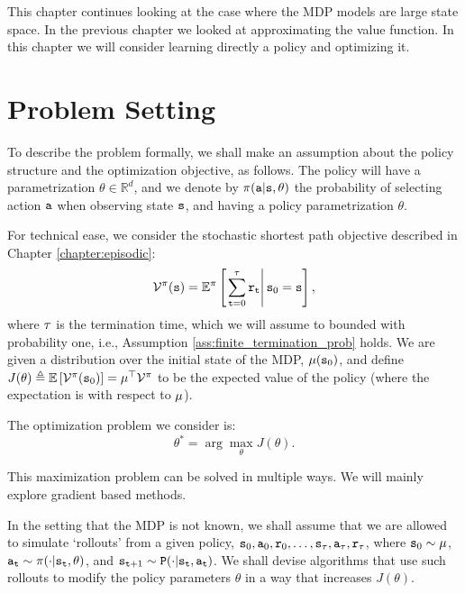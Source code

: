 This chapter continues looking at the case where the MDP models are
large state space. In the previous chapter we looked at
approximating the value function. In this chapter we will consider
learning directly a policy and optimizing it.

\section{Problem Setting}

To describe the problem formally, we shall make an assumption about the policy structure and the optimization objective, as follows. 
The policy will have a
parametrization $\theta\in \mathbb{R}^{d}$, and we denote by 
$\pi({\tt a}|{\tt s},\theta)$ the probability of
selecting action ${\tt a}$ when observing state ${\tt s}$, and having a policy parametrization
$\theta$. 

For technical ease, we consider the stochastic shortest path objective described in Chapter \ref{chapter:episodic}:
\[\mathcal{V}^\pi({\tt s}) = \mathbb E^{\pi }\left[\left.\sum\limits_{{\tt t} = 0}^\tau {{{\tt r}_{\tt t}}} \right|{\tt s}_0 = {\tt s}\right],\]
where $\tau$ is the termination time, which we will assume to bounded with probability one, i.e., Assumption \ref{ass:finite_termination_prob} holds.
We are given a distribution over the initial state of the MDP, $\mu({\tt s}_0)$, and define $J(\theta) \triangleq \mathbb{E}\left[ \mathcal{V}^\pi({\tt s}_0)\right] = \mu^\top \mathcal{V}^\pi$ to be the expected value of the policy (where the expectation is with respect to $\mu$).

The optimization problem we consider is:
\begin{equation}\label{eq:policy_opt}
\theta^* = \arg\max_\theta J(\theta).
\end{equation}

%
This maximization problem can be solved in multiple ways. We will
mainly explore gradient based methods.

In the setting that the MDP is not known, we shall assume that we are allowed to simulate `rollouts' from a given policy, ${\tt s}_0,{\tt a}_0,{\tt r}_0,\dots,{\tt s}_\tau, {\tt a}_\tau, {\tt r}_\tau$, where ${\tt s}_0 \sim \mu$, ${\tt a}_{\tt t}\sim \pi(\cdot|{\tt s}_{\tt t},\theta)$, and ${\tt s}_{{\tt t}+1} \sim {\tt P} (\cdot | {\tt s}_{\tt t}, {\tt a}_{\tt t})$. We shall devise algorithms that use such rollouts to modify the policy parameters $\theta$ in a way that increases $J(\theta)$.

